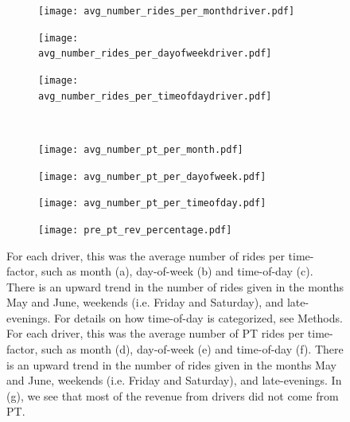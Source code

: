 \documentclass{report}
\begin{document}
			\begin{figure}[!htb]
				\centering
				\begin{subfigure}[t]{0.32\textwidth}
					\texttt{[image: avg\_number\_rides\_per\_monthdriver.pdf]}
					\caption{}
				\end{subfigure}
				\begin{subfigure}[t]{0.32\textwidth}
					\texttt{[image: avg\_number\_rides\_per\_dayofweekdriver.pdf]}
					\caption{}
				\end{subfigure}
				\begin{subfigure}[t]{0.32\textwidth}
					\texttt{[image: avg\_number\_rides\_per\_timeofdaydriver.pdf]}
					\caption{}
				\end{subfigure}\\

				\centering
				\begin{subfigure}[t]{0.24\textwidth}
					\texttt{[image: avg\_number\_pt\_per\_month.pdf]}
					\caption{}
				\end{subfigure}
				\begin{subfigure}[t]{0.24\textwidth}
					\texttt{[image: avg\_number\_pt\_per\_dayofweek.pdf]}
					\caption{}
				\end{subfigure}
				\begin{subfigure}[t]{0.24\textwidth}
					\texttt{[image: avg\_number\_pt\_per\_timeofday.pdf]}
					\caption{}
				\end{subfigure}
				\begin{subfigure}[t]{0.24\textwidth}
					\texttt{[image: pre\_pt\_rev\_percentage.pdf]}
					\caption{}
				\end{subfigure}
				\caption{}
				\label{fig:number_rides_pt}

				\caption{For each driver, this was the average number of rides per time-factor, such as month (a), day-of-week (b) and time-of-day (c). There is an upward trend in the number of rides given in the months May and June, weekends (i.e. Friday and Saturday), and late-evenings. For details on how time-of-day is categorized, see Methods. For each driver, this was the average number of PT rides per time-factor, such as month (d), day-of-week (e) and time-of-day (f). There is an upward trend in the number of rides given in the months May and June, weekends (i.e. Friday and Saturday), and late-evenings. In (g), we see that most of the revenue from drivers did not come from PT.
				}
				\label{fig:number_rides_time}
			\end{figure}
\end{document}
